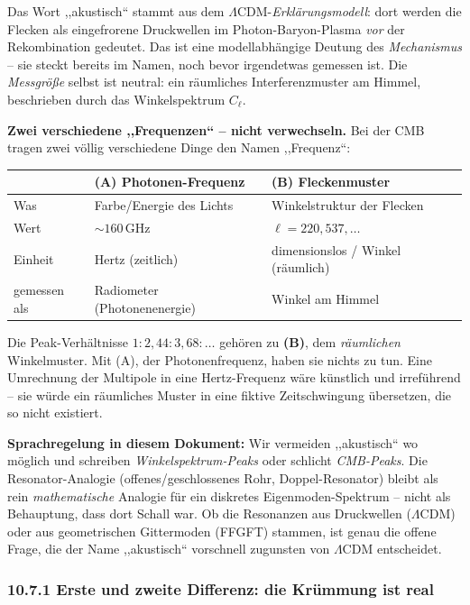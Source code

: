 Das Wort ,,akustisch`` stammt aus dem $\Lambda$CDM-\emph{Erklärungsmodell}:
dort werden die Flecken als eingefrorene Druckwellen im Photon-Baryon-Plasma
\emph{vor} der Rekombination gedeutet. Das ist eine modellabhängige
Deutung des \emph{Mechanismus} -- sie steckt bereits im Namen, noch bevor
irgendetwas gemessen ist. Die \emph{Messgröße} selbst ist neutral: ein
räumliches Interferenzmuster am Himmel, beschrieben durch das
Winkelspektrum $C_\ell$.

\textbf{Zwei verschiedene ,,Frequenzen`` -- nicht verwechseln.} Bei der
CMB tragen zwei völlig verschiedene Dinge den Namen ,,Frequenz``:

\begin{center}
\begin{tabular}{p{1cm}p{5.3cm}p{5.3cm}}
\toprule
 & \textbf{(A) Photonen-Frequenz} & \textbf{(B) Fleckenmuster} \\
\midrule
Was & Farbe/Energie des Lichts & Winkelstruktur der Flecken \\
Wert & $\sim 160$\,GHz & $\ell = 220, 537, \ldots$ \\
Einheit & Hertz (zeitlich) & dimensionslos / Winkel (räumlich) \\
gemessen als & Radiometer (Photonenenergie) & Winkel am Himmel \\
\bottomrule
\end{tabular}
\end{center}

Die Peak-Verhältnisse $1:2{,}44:3{,}68:\ldots$ gehören zu \textbf{(B)},
dem \emph{räumlichen} Winkelmuster. Mit (A), der Photonenfrequenz, haben
sie nichts zu tun. Eine Umrechnung der Multipole in eine Hertz-Frequenz
wäre künstlich und irreführend -- sie würde ein räumliches Muster in
eine fiktive Zeitschwingung übersetzen, die so nicht existiert.

\textbf{Sprachregelung in diesem Dokument:} Wir vermeiden ,,akustisch``
wo möglich und schreiben \emph{Winkelspektrum-Peaks} oder schlicht
\emph{CMB-Peaks}. Die Resonator-Analogie (offenes/geschlossenes Rohr,
Doppel-Resonator) bleibt als rein \emph{mathematische} Analogie für ein
diskretes Eigenmoden-Spektrum -- nicht als Behauptung, dass dort Schall
war. Ob die Resonanzen aus Druckwellen ($\Lambda$CDM) oder aus
geometrischen Gittermoden (FFGFT) stammen, ist genau die offene Frage,
die der Name ,,akustisch`` vorschnell zugunsten von $\Lambda$CDM
entscheidet.

\subsubsection*{10.7.1 Erste und zweite Differenz: die Krümmung ist real}

